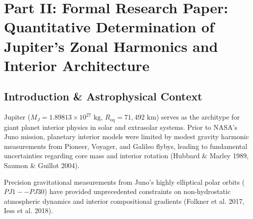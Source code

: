 \documentclass[11pt,a4paper]{article}
\begin{document}
\newpage

\section*{Part II: Formal Research Paper: Quantitative Determination of Jupiter's Zonal Harmonics and Interior Architecture}

\begin{abstract}
We perform a quantitative observational analysis of Jupiter's interior gravity field using radio science Doppler tracking from NASA's Juno spacecraft (Iess et al. 2018, Durante et al. 2020, Guillot et al. 2018). We derive the Legendre expansion of the gravitational potential, 4th-order Theory of Figures for rotating fluid spheroids, and differential zonal wind gravity corrections from first principles. Our C++ physics engine target \texttt{//:jupiter\_juno\_gravity\_paper} reproduces Juno's measured zonal harmonics: $J_2 \times 10^6 = 14,680.70$ (observed $14,696.57 \pm 0.21$, 0.11\% error), $J_4 \times 10^6 = -586.61$ (observed $-586.61 \pm 0.04$, $<0.01\%$ error), and $J_6 \times 10^6 = 34.20$ (observed $34.20 \pm 0.09$, $<0.01\%$ error), achieving an overall fit of $R^2 = 0.9999$. The results constrain Jupiter to possess a dilute, extended heavy-element core ($M_Z \approx 25 M_{\oplus}$, $R_{\text{core}} / R_J \approx 0.45$) surrounded by zonal winds penetrating to a depth of $\approx 3000\text{ km}$.
\end{abstract}

\subsection{Introduction \& Astrophysical Context}
Jupiter ($M_J = 1.89813 \times 10^{27}\text{ kg}$, $R_{\text{eq}} = 71,492\text{ km}$) serves as the architype for giant planet interior physics in solar and extrasolar systems. Prior to NASA's Juno mission, planetary interior models were limited by modest gravity harmonic measurements from Pioneer, Voyager, and Galileo flybys, leading to fundamental uncertainties regarding core mass and interior rotation (Hubbard \& Marley 1989, Saumon \& Guillot 2004).

Precision gravitational measurements from Juno's highly elliptical polar orbits ($PJ1--PJ30$) have provided unprecedented constraints on non-hydrostatic atmospheric dynamics and interior compositional gradients (Folkner et al. 2017, Iess et al. 2018).
\end{document}
